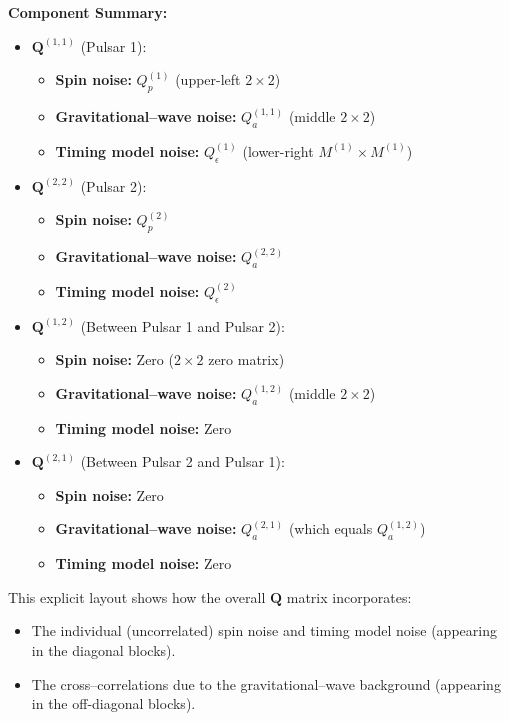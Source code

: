 \documentclass[]{scrartcl}
\begin{document}
	\textbf{Component Summary:}
	\begin{itemize}
		\item \(\boldsymbol{Q}^{(1,1)}\) (Pulsar 1):
		\begin{itemize}
			\item \textbf{Spin noise:} \(Q_p^{(1)}\) (upper-left \(2\times2\))
			\item \textbf{Gravitational--wave noise:} \(Q_a^{(1,1)}\) (middle \(2\times2\))
			\item \textbf{Timing model noise:} \(Q_\epsilon^{(1)}\) (lower-right \(M^{(1)}\times M^{(1)}\))
		\end{itemize}
		\item \(\boldsymbol{Q}^{(2,2)}\) (Pulsar 2):
		\begin{itemize}
			\item \textbf{Spin noise:} \(Q_p^{(2)}\)
			\item \textbf{Gravitational--wave noise:} \(Q_a^{(2,2)}\)
			\item \textbf{Timing model noise:} \(Q_\epsilon^{(2)}\)
		\end{itemize}
		\item \(\boldsymbol{Q}^{(1,2)}\) (Between Pulsar 1 and Pulsar 2):
		\begin{itemize}
			\item \textbf{Spin noise:} Zero (\(2\times2\) zero matrix)
			\item \textbf{Gravitational--wave noise:} \(Q_a^{(1,2)}\) (middle \(2\times2\))
			\item \textbf{Timing model noise:} Zero
		\end{itemize}
		\item \(\boldsymbol{Q}^{(2,1)}\) (Between Pulsar 2 and Pulsar 1):
		\begin{itemize}
			\item \textbf{Spin noise:} Zero
			\item \textbf{Gravitational--wave noise:} \(Q_a^{(2,1)}\) (which equals \(Q_a^{(1,2)}\))
			\item \textbf{Timing model noise:} Zero
		\end{itemize}
	\end{itemize}
	
	This explicit layout shows how the overall \( \boldsymbol{Q} \) matrix incorporates:
	\begin{itemize}
		\item The individual (uncorrelated) spin noise and timing model noise (appearing in the diagonal blocks).
		\item The cross–correlations due to the gravitational--wave background (appearing in the off-diagonal blocks).
	\end{itemize}
	
\end{document}
